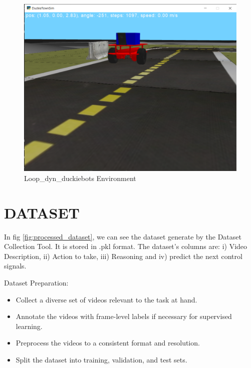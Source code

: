 \begin{spacing}{1.5}
\begin{sloppypar}
\begin{figure}
    \centering 
    \includegraphics[width=1\linewidth]{4/loop dyn bots.png}
    \caption{Loop\_dyn\_duckiebots Environment}
    \label{fig:loop_dyn_duckiebots}
\end{figure}

\section{DATASET}

In fig \ref{fig:processed_dataset}, we can see the dataset generate by the Dataset Collection Tool. It is stored in .pkl format. The dataset's columns are: i) Video Description, ii) Action to take, iii) Reasoning and iv) predict the next control signals.

Dataset Preparation:
\begin{itemize}
    \item Collect a diverse set of videos relevant to the task at hand.
    \item Annotate the videos with frame-level labels if necessary for supervised learning.
    \item Preprocess the videos to a consistent format and resolution.
    \item Split the dataset into training, validation, and test sets.
\end{itemize}



\end{sloppypar}
\end{spacing}
